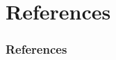 \documentclass{beamer}
\begin{document}
\begin{frame}
\begin{columns}
\begin{column}{.49\textwidth}
\begin{figure}
\begin{center}
 			\par
		\end{center}
	\end{figure}
\end{column}
\end{columns}
\end{frame}






\section{References}
\begin{frame}
	\frametitle{References}
	\framesubtitle{}

        \nocite{newman,cohn,infosys,clemson,fowler_cont_del,naik}
	
\end{frame}

\end{document}
